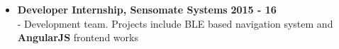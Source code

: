 \documentclass[a4paper,10pt]{article}
\newcommand{\when}[1]{\hfill \textbf{#1}}
\newenvironment{noSepItemize}
{ \begin{itemize}
    \setlength{\itemsep}{1pt}
    \setlength{\parskip}{0pt}
    \setlength{\parsep}{0pt}     }
{ \end{itemize}                  }
\begin{document}
\begin{noSepItemize}
	\\ \indent \indent - Implemented auto tracking of work items via Trello API for easier work overview.
	\\ \indent \indent - Automated logging and mailing of work processes completed over the week for easier accessibility.
	\item \noindent \textbf{Developer Internship, Sensomate Systems} \when{2015 - 16}\\
	\indent - Development team. Projects include BLE based navigation system and \textbf{AngularJS} frontend works
\end{noSepItemize}
\end{document}
